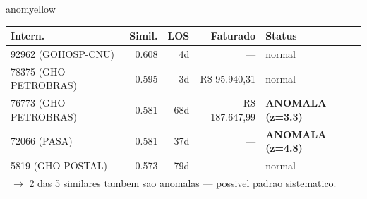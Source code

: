 \documentclass[a4paper,10pt]{article}
\begin{document}
\begin{anomalycard}[Internacao 183637 | PASA | MODERADO (z=2.42)]{anomyellow}
\begin{tabular}{l r r r l}\toprule\textbf{Intern.} & \textbf{Simil.} & \textbf{LOS} & \textbf{Faturado} & \textbf{Status} \\\midrule
92962 (GOHOSP-CNU) & 0.608 & 4d & --- & \textcolor{jcubeblue}{normal} \\
78375 (GHO-PETROBRAS) & 0.595 & 3d & R\$ 95.940,31 & \textcolor{jcubeblue}{normal} \\
76773 (GHO-PETROBRAS) & 0.581 & 68d & R\$ 187.647,99 & \textcolor{anomred}{\textbf{ANOMALA (z=3.3)}} \\
72066 (PASA) & 0.581 & 37d & --- & \textcolor{anomred}{\textbf{ANOMALA (z=4.8)}} \\
5819 (GHO-POSTAL) & 0.573 & 79d & --- & \textcolor{jcubeblue}{normal} \\
\multicolumn{5}{l}{\textcolor{anomred}{\small $\rightarrow$ 2 das 5 similares tambem sao anomalas --- possivel padrao sistematico.}} \\
\bottomrule\end{tabular}


\end{anomalycard}

\newpage
\end{document}
